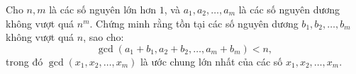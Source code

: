 \ifshowproblem
\begin{problem}\label{example:EGMO-2015-P3}
    Cho \( n, m \) là các số nguyên lớn hơn \( 1 \), và \( a_1, a_2, \dots, a_m \) là các số nguyên dương không vượt quá \( n^m \).  
    Chứng minh rằng tồn tại các số nguyên dương \( b_1, b_2, \dots, b_m \) không vượt quá \( n \), sao cho:
    \[
        \gcd(a_1 + b_1, a_2 + b_2, \dots, a_m + b_m) < n,
    \]
    trong đó \( \gcd(x_1, x_2, \dots, x_m) \) là ước chung lớn nhất của các số \( x_1, x_2, \dots, x_m \).
\end{problem}
\fi

\fi